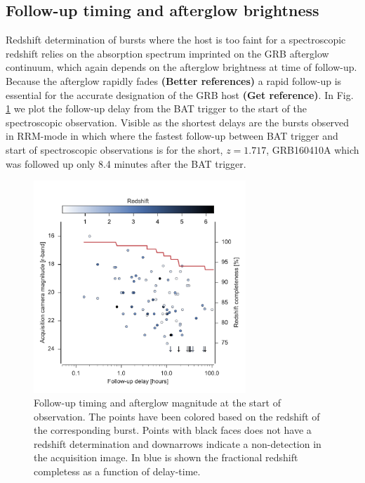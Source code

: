 \documentclass{aa}    %
\newcommand\todo[1]{\textbf{(#1)}}
\begin{document}
\subsection{Follow-up timing and afterglow brightness} \label{timing}

Redshift determination of bursts where the host is too faint for a spectroscopic
redshift relies on the absorption spectrum imprinted on the GRB afterglow
continuum, which again depends on the afterglow brightness at time of follow-up.
Because the afterglow rapidly fades \citep{Nousek2006, Vecchio2016}\todo{Better references} a rapid
follow-up is essential for the accurate designation of the GRB host \todo{Get
reference}. In Fig. \ref{fig:timing} we plot the follow-up delay from the BAT
trigger to the start of the spectroscopic observation. Visible as the
shortest delays are the bursts observed in RRM-mode in which where the fastest follow-up
between BAT trigger and start of spectroscopic observations is for the short, $z = 1.717$, GRB160410A which was
followed up only 8.4 minutes after the BAT trigger.


\begin{figure}
	\centerline{\includegraphics[width=8cm]{figures/timing.pdf}}
	\caption{Follow-up timing and afterglow magnitude at the start of observation.
	The points have been colored based on the redshift of the corresponding burst.
	Points with black faces does not have a redshift determination and downarrows
	indicate a non-detection in the acquisition image. In blue is shown the
	fractional redshift completess as a function of delay-time.}
	\label{fig:timing}
\end{figure}
\end{document}
